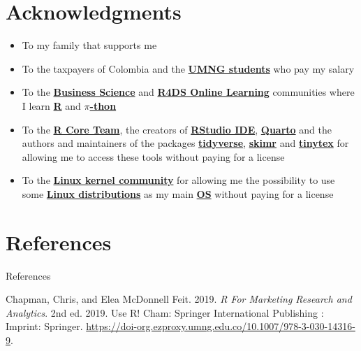 \documentclass[
  ignorenonframetext,
]{beamer}
\newlength{\cslhangindent}
\newenvironment{CSLReferences}[2] %
 {\begin{list}{}{%
  \setlength{\itemindent}{0pt}
  \setlength{\leftmargin}{0pt}
  \setlength{\parsep}{0pt}
  \ifodd #1
   \setlength{\leftmargin}{\cslhangindent}
   \setlength{\itemindent}{-1\cslhangindent}
  \fi
  \setlength{\itemsep}{#2\baselineskip}}}
 {\end{list}}
\begin{document}
\section{Acknowledgments}\label{acknowledgments}

\begin{frame}{}
\label{section-17}
\begin{itemize}
\item
  To my family that supports me
\item
  To the taxpayers of Colombia and the
  \href{https://www.umng.edu.co/estudiante}{\textbf{UMNG students}} who
  pay my salary
\item
  To the \href{https://www.business-science.io/}{\textbf{Business
  Science}} and \href{https://www.rfordatasci.com/}{\textbf{R4DS Online
  Learning}} communities where I learn
  \href{https://www.r-project.org/about.html}{\textbf{R}} and
  \href{https://www.python.org/about/}{\textbf{\(\pi\)-thon}}
\item
  To the \href{https://www.r-project.org/contributors.html}{\textbf{R
  Core Team}}, the creators of
  \href{https://posit.co/products/open-source/rstudio/}{\textbf{RStudio
  IDE}}, \href{https://quarto.org/}{\textbf{Quarto}} and the authors and
  maintainers of the packages
  \href{https://CRAN.R-project.org/package=tidyverse}{\textbf{tidyverse}},
  \href{https://CRAN.R-project.org/package=skimr}{\textbf{skimr}} and
  \href{https://CRAN.R-project.org/package=tinytex}{\textbf{tinytex}}
  for allowing me to access these tools without paying for a license
\item
  To the \href{https://www.kernel.org/category/about.html}{\textbf{Linux
  kernel community}} for allowing me the possibility to use some
  \href{https://static.lwn.net/Distributions/}{\textbf{Linux
  distributions}} as my main
  \href{https://en.wikipedia.org/wiki/Operating_system}{\textbf{OS}}
  without paying for a license
\end{itemize}
\end{frame}

\section*{References}\label{references}

\begin{frame}[allowframebreaks]{References}
\label{refs}
\begin{CSLReferences}{1}{0}
Chapman, Chris, and Elea McDonnell Feit. 2019. \emph{R {For} {Marketing}
{Research} and {Analytics}}. 2nd ed. 2019. Use {R}! Cham: Springer
International Publishing : Imprint: Springer.
\url{https://doi-org.ezproxy.umng.edu.co/10.1007/978-3-030-14316-9}.

\end{CSLReferences}
\end{frame}
\end{document}
